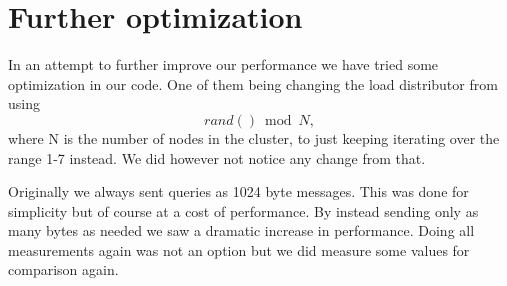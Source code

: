 \section{Further optimization}
In an attempt to further improve our performance we have tried some optimization in our code. One of them being changing the load distributor from using $$rand() \bmod N,$$ where N is the number of nodes in the cluster, to just keeping iterating over the range 1-7 instead. We did however not notice any change from that.

Originally we always sent queries as 1024 byte messages. This was done for simplicity but of course at a cost of performance. By instead sending only as many bytes as needed we saw a dramatic increase in performance. Doing all measurements again was not an option but we did measure some values for comparison again.

















